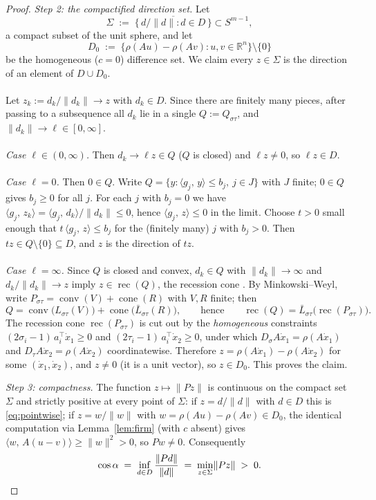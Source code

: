 \documentclass[11pt]{article}
\numberwithin{equation}{section}
\theoremstyle{remark}
\newcommand{\R}{\mathbb{R}}
\DeclareMathOperator{\rec}{rec}
\DeclareMathOperator{\conv}{conv}
\DeclareMathOperator{\cone}{cone}
\newcommand{\norm}[1]{\lVert #1\rVert}
\newcommand{\ip}[2]{\langle #1,\,#2\rangle}
\begin{document}
\begin{proof}
\emph{Step 2: the compactified direction set.}
Let
\[
\Sigma\;:=\;\overline{\{\,d/\norm{d} : d\in D\,\}}\subset S^{m-1},
\]
a compact subset of the unit sphere, and let
\[
D_0\;:=\;\{\rho(Au)-\rho(Av) : u,v\in\R^n\}\setminus\{0\}
\]
be the homogeneous ($c=0$) difference set. We claim every $z\in\Sigma$ is the direction of an element of $D\cup D_0$.\\
\\
Let $z_k:=d_k/\norm{d_k}\to z$ with $d_k\in D$. Since there are finitely many pieces, after passing to a subsequence all $d_k$ lie in a single $Q:=Q_{\sigma\tau}$, and $\norm{d_k}\to\ell\in[0,\infty]$.\\
\\
\emph{Case $\ell\in(0,\infty)$.} Then $d_k\to\ell z\in Q$ ($Q$ is closed) and $\ell z\ne 0$, so $\ell z\in D$.\\
\\
\emph{Case $\ell=0$.} Then $0\in Q$. Write $Q=\{y:\ip{g_j}{y}\le b_j,\ j\in J\}$ with $J$ finite; $0\in Q$ gives $b_j\ge 0$ for all $j$. For each $j$ with $b_j=0$ we have $\ip{g_j}{z_k}=\ip{g_j}{d_k}/\norm{d_k}\le 0$, hence $\ip{g_j}{z}\le 0$ in the limit. Choose $t>0$ small enough that $t\,\ip{g_j}{z}\le b_j$ for the (finitely many) $j$ with $b_j>0$. Then $tz\in Q\setminus\{0\}\subseteq D$, and $z$ is the direction of $tz$.\\
\\
\emph{Case $\ell=\infty$.} Since $Q$ is closed and convex, $d_k\in Q$ with $\norm{d_k}\to\infty$ and $d_k/\norm{d_k}\to z$ imply $z\in\rec(Q)$, the recession cone \cite[Thm.~8.2]{Rock}. By Minkowski--Weyl, write $P_{\sigma\tau}=\conv(V)+\cone(R)$ with $V,R$ finite; then
\[
Q=\conv\bigl(L_{\sigma\tau}(V)\bigr)+\cone\bigl(\bar L_{\sigma\tau}(R)\bigr),
\qquad\text{hence}\qquad
\rec(Q)=\bar L_{\sigma\tau}\bigl(\rec(P_{\sigma\tau})\bigr).
\]
The recession cone $\rec(P_{\sigma\tau})$ is cut out by the \emph{homogeneous} constraints $(2\sigma_i-1)\,a_i^{\top}\dot x_1\ge 0$ and $(2\tau_i-1)\,a_i^{\top}\dot x_2\ge 0$, under which $D_\sigma A\dot x_1=\rho(A\dot x_1)$ and $D_\tau A\dot x_2=\rho(A\dot x_2)$ coordinatewise. Therefore $z=\rho(A\dot x_1)-\rho(A\dot x_2)$ for some $(\dot x_1,\dot x_2)$, and $z\ne 0$ (it is a unit vector), so $z\in D_0$. This proves the claim.

\emph{Step 3: compactness.}
The function $z\mapsto\norm{Pz}$ is continuous on the compact set $\Sigma$ and strictly positive at every point of $\Sigma$: if $z=d/\norm{d}$ with $d\in D$ this is \eqref{eq:pointwise}; if $z=w/\norm{w}$ with $w=\rho(Au)-\rho(Av)\in D_0$, the identical computation via Lemma~\ref{lem:firm} (with $c$ absent) gives $\ip{w}{A(u-v)}\ge\norm{w}^2>0$, so $Pw\ne 0$. Consequently
\[
\cos\alpha\;=\;\inf_{d\in D}\frac{\norm{Pd}}{\norm{d}}\;=\;\min_{z\in\Sigma}\norm{Pz}\;>\;0 . \qedhere
\]
\end{proof}
\end{document}
